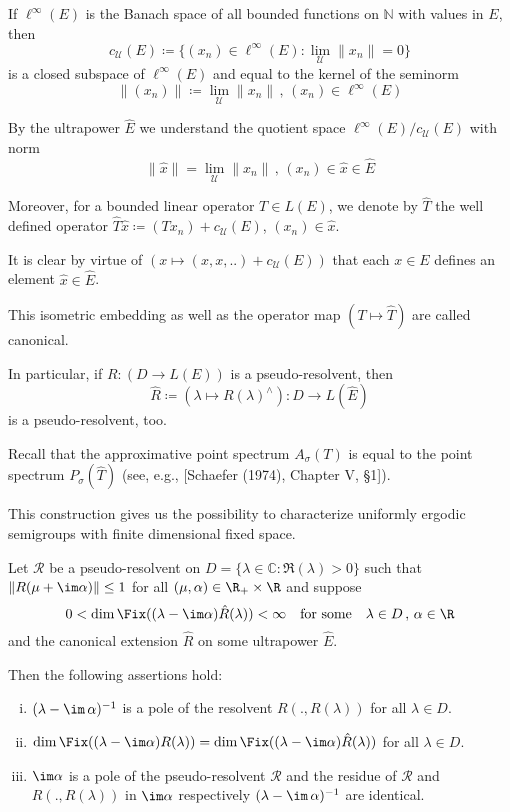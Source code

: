 If $\ell^{\infty}(E)$ is the Banach space of all bounded functions on $\mathbb{N}$ with values in $E$, then
\[
c_{\mathcal{U}}(E) \coloneqq \{(x_{n}) \in \ell^{\infty}(E) \colon \lim_{\mathcal{U}}\|x_{n}\| = 0\}
\]
is a closed subspace of $\ell^{\infty}(E)$ and equal to the kernel of the seminorm
\[
\|(x_{n})\| \coloneqq \lim_{\mathcal{U}}\|x_{n}\| \, , \, (x_{n}) \in \ell^{\infty}(E)
\]

By the ultrapower $\hat{E}$ we understand the quotient space $\ell^{\infty}(E)/c_{\mathcal{U}}(E)$ with norm
\[
\|\hat{x}\| = \lim_{\mathcal{U}}\|x_{n}\| \, , \, (x_{n}) \in \hat{x} \in \hat{E}
\]

Moreover, for a bounded linear operator $T \in L(E)$, we denote by $\hat{T}$ the well defined operator $\hat{T}\hat{x} \coloneqq (Tx_{n}) + c_{\mathcal{U}}(E)$, $(x_{n}) \in \hat{x}$.

It is clear by virtue of $(x \mapsto (x, x, ..) + c_{\mathcal{U}}(E))$ that each $x \in E$ defines an element $\hat{x} \in \hat{E}$.

This isometric embedding as well as the operator map $(T \mapsto \hat{T})$ are called canonical.

In particular, if $R: (D \to L(E))$ is a pseudo-resolvent, then
\[
\hat{R} \coloneqq (\lambda \mapsto R(\lambda)^{\wedge}): D \to L(\hat{E})
\]
is a pseudo-resolvent, too.

Recall that the approximative point spectrum $A_{\sigma}(T)$ is equal to the point spectrum $P_{\sigma}(\hat{T})$ (see, e.g., [Schaefer (1974), Chapter V, §1]).

This construction gives us the possibility to characterize uniformly ergodic semigroups with finite dimensional fixed space.

\begin{lemma}\label{lem:d3-2.2}
Let $\mathcal{R}$ be a pseudo-resolvent on $D = \{\lambda \in \mathbb{C} \colon \Re(\lambda) > 0\}$ such that $\|R(\mu+\im\alpha)\| \leq 1$ for all $(\mu,\alpha) \in \R_{+} \times \R$ and suppose
\[
0 < \dim \Fix((\lambda-\im\alpha)\hat{R}(\lambda)) < \infty \quad \text{for some} \quad \lambda \in D \, , \, \alpha \in \R
\]
and the canonical extension $\hat{R}$ on some ultrapower $\hat{E}$.





Then the following assertions hold:

\begin{enumerate}[(i)]
\item $(\lambda - \im\,\alpha)^{-1}$ is a pole of the resolvent $R(.,R(\lambda))$ for all $\lambda \in D$.

\item $\dim \Fix((\lambda-\im\alpha)R(\lambda)) = \dim \Fix((\lambda-\im\alpha)\hat{R}(\lambda))$ for all $\lambda \in D$.

\item $\im\alpha$ is a pole of the pseudo-resolvent $\mathcal{R}$ and the residue of $\mathcal{R}$ and $R(.,R(\lambda))$ in $\im\alpha$ respectively $(\lambda - \im\,\alpha)^{-1}$ are identical.
\end{enumerate}
\end{lemma}

